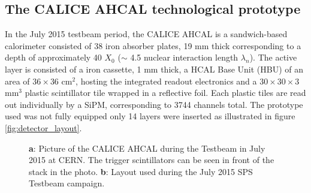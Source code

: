 \documentclass[twoside,a4paper,11pt]{article}
\begin{document}
\subsection{The CALICE AHCAL technological prototype}

In the July 2015 testbeam period, the CALICE AHCAL is a sandwich-based calorimeter consisted of 38 iron absorber plates, 19 mm thick corresponding to a depth of approximately 40 $X_0$ ($\sim$ 4.5 nuclear interaction length $\lambda_{n}$). The active layer is consisted of a iron cassette, 1 mm thick, a HCAL Base Unit (HBU) of an area of $36\times36$ cm$^2$, hosting the integrated readout electronics and a $30\times30\times3$ mm$^3$ plastic scintillator tile wrapped in a reflective foil. Each plastic tiles are read out individually by a SiPM, corresponding to 3744 channels total.
The prototype used was not fully equipped only 14 layers were inserted as illustrated in figure \ref{fig:detector_layout}. 

\begin{figure}[htbp]
	\hfill
	\caption[]{\textbf{a}: Picture of the CALICE AHCAL during the Testbeam in July 2015 at CERN. The trigger scintillators can be seen in front of the stack in the photo. \textbf{b}: Layout used during the July 2015 SPS Testbeam campaign.}
	\label{fig:full_detector_layout}
\end{figure}
\end{document}
